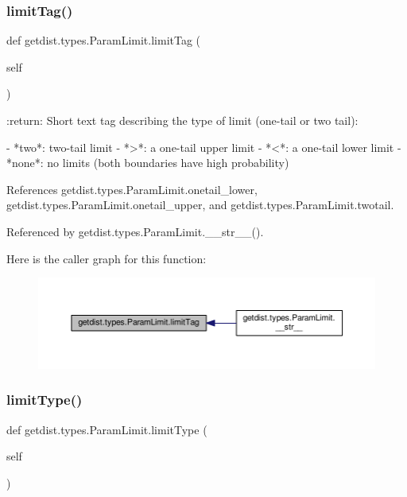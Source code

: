 \subsubsection{\texorpdfstring{limit\+Tag()}{limitTag()}}
{\footnotesize\ttfamily def getdist.\+types.\+Param\+Limit.\+limit\+Tag (\begin{DoxyParamCaption}\item[{}]{self }\end{DoxyParamCaption})}

\begin{DoxyVerb}:return: Short text tag describing the type of limit (one-tail or two tail):

- *two*: two-tail limit
- *>*: a one-tail upper limit
- *<*: a one-tail lower limit
- *none*: no limits (both boundaries have high probability)
\end{DoxyVerb}
 

References getdist.\+types.\+Param\+Limit.\+onetail\+\_\+lower, getdist.\+types.\+Param\+Limit.\+onetail\+\_\+upper, and getdist.\+types.\+Param\+Limit.\+twotail.



Referenced by getdist.\+types.\+Param\+Limit.\+\_\+\+\_\+str\+\_\+\+\_\+().

Here is the caller graph for this function\+:
\nopagebreak
\begin{figure}[H]
\begin{center}
\leavevmode
\includegraphics[width=350pt]{classgetdist_1_1types_1_1ParamLimit_a06297a09c2c213f58005465681751d6f_icgraph}
\end{center}
\end{figure}
\mbox{\label{classgetdist_1_1types_1_1ParamLimit_ae64d07650fed8969357151a0d56ffadc}} 
\subsubsection{\texorpdfstring{limit\+Type()}{limitType()}}
{\footnotesize\ttfamily def getdist.\+types.\+Param\+Limit.\+limit\+Type (\begin{DoxyParamCaption}\item[{}]{self }\end{DoxyParamCaption})}


